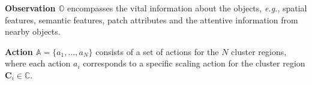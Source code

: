\documentclass[letterpaper]{article} %
\def \eg {\emph{e.g.}}
\def \ie {\emph{i.e.}}
\newcommand\blue[1]{\textcolor{blue}{#1}}
\newcommand\rjf[1]{\textcolor{red}{\{RJF: #1\}}}
\begin{document}

\noindent\textbf{Observation $\mathbb{O}$} encompasses the vital information about the objects, \eg, spatial features, semantic features, patch attributes and the attentive information from nearby objects. %




\noindent\textbf{Action $\mathbb{A} = \{a_1, \dots, a_N\}$}
consists of a set of actions for the $N$ cluster regions, where each action $a_i$ corresponds to a specific scaling action for the cluster region $\bm{C}_i\in\mathbb{C}$. %
\end{document}
